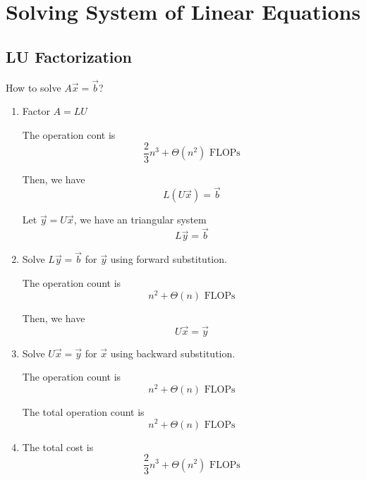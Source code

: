 \section{Solving System of Linear Equations}

\subsection{LU Factorization}

How to solve \( A \vec{x} = \vec{b} \)?

\begin{enumerate}
    \item Factor \( A = LU \)

          The operation cont is \[
              \frac{2}{3} n^3 + \Theta(n^2) \text{ FLOPs}
          \]

          Then, we have \[
              L(U \vec{x}) = \vec{b}
          \]

          Let \( \vec{y} = U\vec{x} \), we have an triangular system \[
              L \vec{y} = \vec{b}
          \]

    \item Solve \( L \vec{y} = \vec{b} \) for \( \vec{y} \) using forward substitution.

          The operation count is \[
              n^2 + \Theta(n) \text{ FLOPs}
          \]

          Then, we have \[
              U \vec{x} = \vec{y}
          \]

    \item Solve \( U \vec{x} = \vec{y} \) for \( \vec{x} \) using backward substitution.

          The operation count is \[
              n^2 + \Theta(n) \text{ FLOPs}
          \]

          The total operation count is \[
              n^2 + \Theta(n) \text{ FLOPs}
          \]

    \item The total cost is \[
              \frac{2}{3} n^3 + \Theta(n^2) \text{ FLOPs}
          \]
\end{enumerate}

